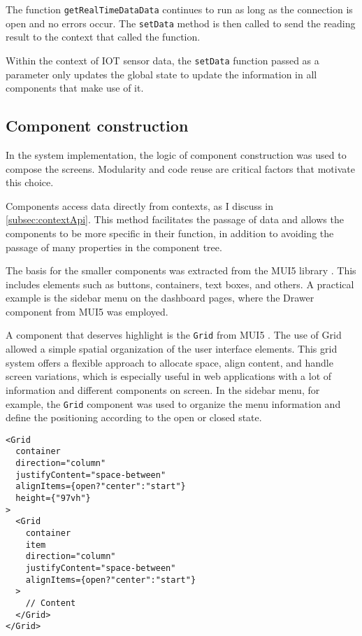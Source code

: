 The function \texttt{getRealTimeDataData} continues to run as long as the connection is open and no errors occur. The \texttt{setData} method is then called to send the reading result to the context that called the function.

Within the context of IOT sensor data, the \texttt{setData} function passed as a parameter only updates the global state to update the information in all components that make use of it.

\subsection{Component construction}\label{subsec:componentization}
In the system implementation, the logic of component construction \cite{reactFirstComponent} was used to compose the screens. Modularity and code reuse are critical factors that motivate this choice.

Components access data directly from contexts, as I discuss in \ref{subsec:contextApi}. This method facilitates the passage of data and allows the components to be more specific in their function, in addition to avoiding the passage of many properties in the component tree.

The basis for the smaller components was extracted from the \gls{MUI5} library \cite{muiDocs}. This includes elements such as buttons, containers, text boxes, and others. A practical example is the sidebar menu on the dashboard pages, where the Drawer component from \gls{MUI5} was employed.

A component that deserves highlight is the \texttt{Grid} from \gls{MUI5} \cite{muiReactGrid}. The use of Grid allowed a simple spatial organization of the user interface elements. This grid system offers a flexible approach to allocate space, align content, and handle screen variations, which is especially useful in web applications with a lot of information and different components on screen. In the sidebar menu, for example, the \texttt{Grid} component was used to organize the menu information and define the positioning according to the open or closed state.

\begin{Verbatim}[fontsize=\small, baselinestretch=0.8]
<Grid 
  container
  direction="column"
  justifyContent="space-between"
  alignItems={open?"center":"start"}
  height={"97vh"}
>
  <Grid 
    container
    item
    direction="column"
    justifyContent="space-between"
    alignItems={open?"center":"start"}
  >
    // Content
  </Grid>
</Grid>
\end{Verbatim}

